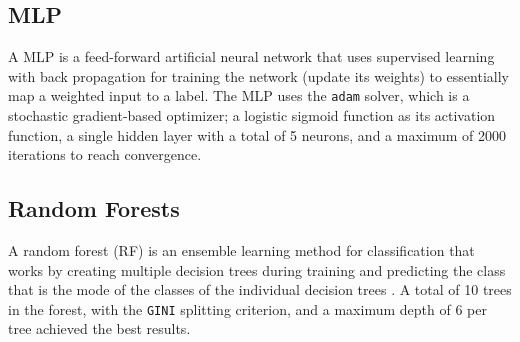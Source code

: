 \subsection{MLP}

A MLP is a feed-forward artificial neural network that uses supervised learning with back propagation for training the network (update its weights) to essentially map a weighted input to a label. The MLP uses the \texttt{adam} solver, which is a stochastic gradient-based optimizer; a logistic sigmoid function as its activation function, a single hidden layer with a total of 5 neurons, and a maximum of 2000 iterations to reach convergence.

\subsection{Random Forests}

A random forest (RF) is an ensemble learning method for classification that works by creating multiple decision trees during training and predicting the class that is the mode of the classes of the individual decision trees \cite{data-mining-intro}. A total of 10 trees in the forest, with the \texttt{GINI} splitting criterion, and a maximum depth of 6 per tree achieved the best results.
